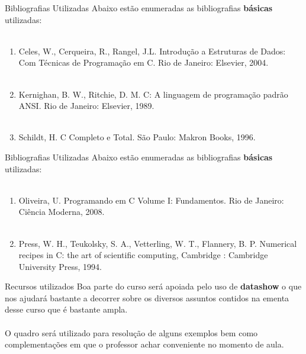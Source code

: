 \documentclass{beamer}
\begin{document}
\begin{frame}{Bibliografias Utilizadas}
Abaixo estão enumeradas as bibliografias \textbf{básicas} utilizadas:\\~\\
\begin{enumerate}
	\item Celes, W., Cerqueira, R., Rangel, J.L. Introdução a Estruturas de Dados: Com Técnicas de Programação em C. Rio de Janeiro: Elsevier, 2004.\\~\\
	\item Kernighan, B. W., Ritchie, D. M. C: A linguagem de programação padrão ANSI. Rio de Janeiro: Elsevier, 1989.\\~\\
	\item Schildt, H. C Completo e Total. São Paulo: Makron Books, 1996.
\end{enumerate}
\end{frame}

\begin{frame}{Bibliografias Utilizadas}
Abaixo estão enumeradas as bibliografias \textbf{básicas} utilizadas:\\~\\
\begin{enumerate}
	\item Oliveira, U. Programando em C Volume I: Fundamentos. Rio de Janeiro: Ciência Moderna, 2008.\\~\\
	\item Press, W. H., Teukolsky, S. A., Vetterling, W. T., Flannery, B. P. Numerical recipes in C: the art of scientific computing, Cambridge : Cambridge University Press, 1994.
\end{enumerate}
\end{frame}	

\begin{frame}{Recursos utilizados}
Boa parte do curso será apoiada pelo uso de \textbf{datashow} o que nos ajudará bastante a decorrer sobre os diversos assuntos contidos na ementa desse curso que é bastante ampla. \\~\\

O quadro será utilizado para resolução de alguns exemplos bem como complementações em que o professor achar conveniente no momento de aula.
\end{frame}
\end{document}
